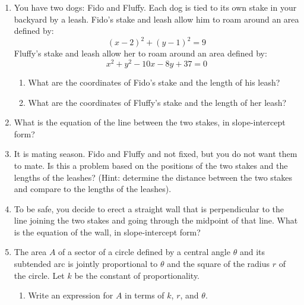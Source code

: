 \documentclass[letterpaper,12pt,fleqn]{article}
\begin{document}
\begin{enumerate}

\item You have two dogs: Fido and Fluffy. Each dog is tied to its own stake in
your backyard by a leash. Fido's stake and leash allow him to roam around an
area defined by:
\[(x-2)^2+(y-1)^2=9\]
Fluffy's stake and leash allow her to roam around an area defined by:
\[x^2+y^2-10x-8y+37=0\]
\begin{enumerate}
\item What are the coordinates of Fido's stake and the length of his leash?

\vspace{0.5in}

\item What are the coordinates of Fluffy's stake and the length of her leash?
\end{enumerate}

\vspace{2.0in}

\item What is the equation of the line between the two stakes, in
slope-intercept form?

\newpage

\item It is mating season. Fido and Fluffy and not fixed, but you do not want
them to mate. Is this a problem based on the positions of the two stakes and
the lengths of the leashes?  (Hint: determine the distance between the two
stakes and compare to the lengths of the leashes).

\vspace{3.0in}

\item To be safe, you decide to erect a straight wall that is perpendicular to
the line joining the two stakes and going through the midpoint of that line.
What is the equation of the wall, in slope-intercept form?

\newpage

\item The area $A$ of a sector of a circle defined by a central angle $\theta$
and its subtended arc is jointly proportional to $\theta$ and the square of the
radius $r$ of the circle.  Let $k$ be the constant of proportionality.
\begin{enumerate}
\item Write an expression for $A$ in terms of $k$, $r$, and $\theta$.

\vspace{1.0in}


\end{enumerate}
\end{enumerate}
\end{document}
